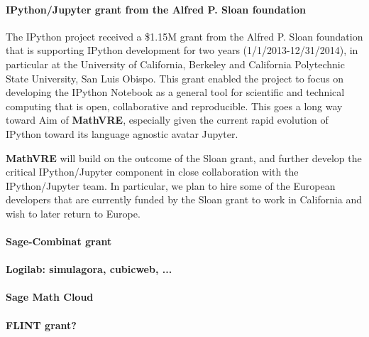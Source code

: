 \documentclass[a4paper,11pt]{article}
\newcommand{\XX}{\textbf{MathVRE}\xspace}
\newcommand{\TheProject}{\XX}
\begin{document}

\paragraph{IPython/Jupyter grant from the Alfred P. Sloan foundation}

The IPython project received a \$1.15M grant from the Alfred P. Sloan
foundation that is supporting IPython development for two years
(1/1/2013-12/31/2014), in particular at the University of California,
Berkeley and California Polytechnic State University, San Luis Obispo.
This grant enabled the project to focus on developing the IPython
Notebook as a general tool for scientific and technical computing that
is open, collaborative and reproducible. This goes a long way toward
Aim  of \TheProject, especially given the current
rapid evolution of IPython toward its language agnostic avatar
Jupyter.

\TheProject will build on the outcome of the Sloan grant, and further
develop the critical IPython/Jupyter component in close collaboration
with the IPython/Jupyter team. In particular, we plan to hire some of
the European developers that are currently funded by the Sloan grant
to work in California and wish to later return to Europe.

\paragraph{Sage-Combinat grant}

\paragraph{Logilab: simulagora, cubicweb, ...}


\paragraph{Sage Math Cloud}

\paragraph{FLINT grant?}
\end{document}
